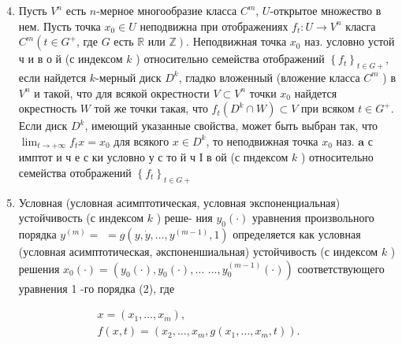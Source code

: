 \documentclass[10pt]{article}
\begin{document}
\begin{enumerate}

  \setcounter{enumi}{3}

  \item Пусть $V^{n}$ есть $n$-мерное многообразие класса $C^{m}$, $U$-открытое множество в нем. Пусть точка $x_{0} \in U$ неподвижна при отображениях $f_{t}: U \longrightarrow V^{n}$ класга $C^{m}\left(t \in G^{+}\right.$, где $G$ есть $\mathbb{R}$ или $\left.\mathbb{Z}\right)$. Неподвижная точка $x_{0}$ наз. условно устой ч и в о й (с индексом $k$ ) относительно семейства отображений $\left\{f_{t}\right\}_{t \in G+}$, если найдется $k$-мерный диск $D^{k}$, гладко вложенный (вложение класса $C^{m}$ ) в $V^{n}$ и такой, что для всякой окрестности $V \subset V^{n}$ точки $x_{0}$ найдется окрестность $W$ той же точки такая, что $f_{t}\left(D^{k} \cap W\right) \subset V$ при всяком $t \in G^{+}$. Если диск $D^{k}$, имеющий указанные свойства, может быть выбран так, что $\lim _{t \rightarrow+\infty} f_{t} x=x_{0}$ для всякого $x \in D^{k}$, то неподвижная точка $x_{0}$ наз. $\mathbf{a}$ с имптот и ч е с ки условно у с то й ч І в ой (с пндексом $k$ ) относительно семейства отображений $\left\{f_{t}\right\}_{t \in G+}$



  \item Условная (условная асимптотическая, условная экспоненциальная) устойчивость (с индексом $k$ ) реше- ния $y_{0}(\cdot)$ уравнения произвольного порядка $y^{(m)}=$ $=g\left(y, \dot{y}, \ldots, y^{(m-1)}, 1\right)$ определяется как условная (условная асимптотическая, әкспоненшиальная) устойчивость (с индексом $k$ ) решения $x_{0}(\cdot)=\left(y_{0}(\cdot), y_{0}(\cdot), \ldots\right.$ $\left.\ldots, y_{0}^{(m-1)}(\cdot)\right)$ соответствующего уравнения 1 -го порядка (2), где



\end{enumerate}



\[

\begin{gathered}

x=\left(x_{1}, \ldots, x_{m}\right), \\

f(x, t)=\left(x_{2}, \ldots, x_{m}, g\left(x_{1}, \ldots, x_{m}, t\right)\right) .

\end{gathered}

\]
\end{document}
